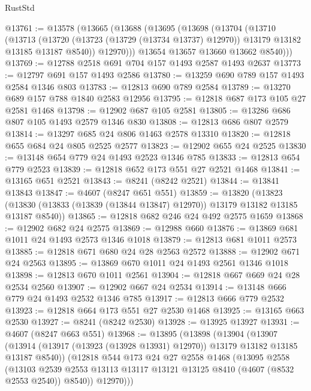 \begin{lexlean}{RustStd}
\begin{coremodule}
@13761 := @13578
    (@13665
      (@13688
        (@13695
          (@13698
            (@13704
              (@13710
                (@13713
                  (@13720
                    (@13723 (@13729 (@13734 @13737) @12970))
                    @13179
                    @13182
                    @13185
                    @13187
                    @8540))
                @12970)))
          @13654
          @13657
          @13660
          @13662
          @8540)))
@13769 := @12788 @2518 @691 @704 @157 @1493 @2587 @1493 @2637
@13773 := @12797 @691 @157 @1493 @2586
@13780 := @13259 @690 @789 @157 @1493 @2584 @1346 @803
@13783 := @12813 @690 @789 @2584
@13789 := @13270 @689 @157 @788 @1840 @2583 @12956
@13795 := @12818 @687 @173 @105 @27 @2581 @1468
@13798 := @12902 @687 @105 @2581
@13805 := @13286 @686 @807 @105 @1493 @2579 @1346 @830
@13808 := @12813 @686 @807 @2579
@13814 := @13297 @685 @24 @806 @1463 @2578 @13310
@13820 := @12818 @655 @684 @24 @805 @2525 @2577
@13823 := @12902 @655 @24 @2525
@13830 := @13148 @654 @779 @24 @1493 @2523 @1346 @785
@13833 := @12813 @654 @779 @2523
@13839 := @12818 @652 @173 @551 @27 @2521 @1468
@13841 := @13165 @651 @2521
@13843 := @8241 (@8242 @2521)
@13844 := @13841 @13843
@13847 := @4607 (@8247 @651 @551)
@13859 := @13820
    (@13823 (@13830 (@13833 (@13839 (@13844 @13847) @12970)) @13179 @13182 @13185 @13187 @8540))
@13865 := @12818 @682 @246 @24 @492 @2575 @1659
@13868 := @12902 @682 @24 @2575
@13869 := @12988 @660
@13876 := @13869 @681 @1011 @24 @1493 @2573 @1346 @1018
@13879 := @12813 @681 @1011 @2573
@13885 := @12818 @671 @680 @24 @28 @2563 @2572
@13888 := @12902 @671 @24 @2563
@13895 := @13869 @670 @1011 @24 @1493 @2561 @1346 @1018
@13898 := @12813 @670 @1011 @2561
@13904 := @12818 @667 @669 @24 @28 @2534 @2560
@13907 := @12902 @667 @24 @2534
@13914 := @13148 @666 @779 @24 @1493 @2532 @1346 @785
@13917 := @12813 @666 @779 @2532
@13923 := @12818 @664 @173 @551 @27 @2530 @1468
@13925 := @13165 @663 @2530
@13927 := @8241 (@8242 @2530)
@13928 := @13925 @13927
@13931 := @4607 (@8247 @663 @551)
@13968 := @13895
    (@13898
      (@13904
        (@13907 (@13914 (@13917 (@13923 (@13928 @13931) @12970)) @13179 @13182 @13185 @13187 @8540))
        (@12818
          @544
          @173
          @24
          @27
          @2558
          @1468
          (@13095
            @2558
            (@13103
              @2539
              @2553
              @13113
              @13117
              @13121
              @13125
              @8410
              (@4607 (@8532 @2553 @2540))
              @8540))
          @12970)))

\end{coremodule}
\end{lexlean}
